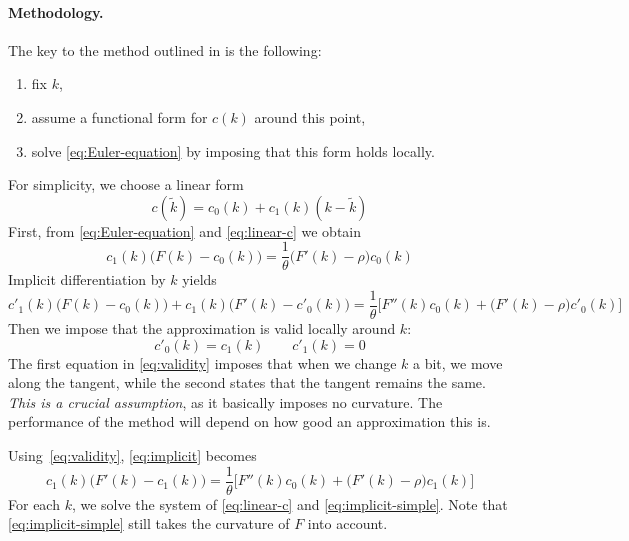 \documentclass[a4paper,11pt]{article}
\newcommand{\tk}{\tilde{k}}
\begin{document}
\paragraph{Methodology.} The key to the method outlined in \textcite{den2015exact} is the following:
\begin{enumerate}
\item fix $k$,
\item assume a functional form for $c(k)$ around this point,
\item solve \eqref{eq:Euler-equation} by imposing that this form holds locally.
\end{enumerate}
For simplicity, we choose a linear form
\begin{equation}
  \label{eq:linear-c}
  c(\tk) = c_0(k) + c_1(k)(k-\tk)
\end{equation}
First, from \eqref{eq:Euler-equation} and \eqref{eq:linear-c} we obtain
\begin{equation}
  \label{eq:linear-Euler}
  c_1(k)\bigl( F(k) - c_0(k) \bigr) = \frac{1}{\theta}\bigl( F'(k) - \rho \bigr) c_0(k) 
\end{equation}
Implicit differentiation by $k$ yields
\begin{equation}
  \label{eq:implicit}
  c'_1(k)\bigl( F(k) - c_0(k) \bigr) + c_1(k)\bigl( F'(k) - c'_0(k) \bigr) =
  \frac{1}{\theta}\biggl[ F''(k) c_0(k) + \bigl( F'(k) - \rho \bigr) c'_0(k) \biggr]
\end{equation}
Then we impose that the approximation is valid locally around $k$:
\begin{equation}
  \label{eq:validity}
  c'_0(k) = c_1(k)
  \qquad
  c'_1(k) = 0
\end{equation}
The first equation in \eqref{eq:validity} imposes that when we change $k$ a bit, we move along the tangent, while the second states that the tangent remains the same. \emph{This is a crucial assumption}, as it basically imposes no curvature. The performance of the method will depend on how good an approximation this is.

Using~\eqref{eq:validity}, \eqref{eq:implicit} becomes
\begin{equation}
  \label{eq:implicit-simple}
  c_1(k)\bigl( F'(k) - c_1(k) \bigr) = \frac{1}{\theta}\biggl[ F''(k) c_0(k) + \bigl( F'(k) - \rho \bigr) c_1(k) \biggr]
\end{equation}
For each $k$, we solve the system of \eqref{eq:linear-c} and \eqref{eq:implicit-simple}. 
Note that \eqref{eq:implicit-simple} still takes the curvature of $F$ into account.
\end{document}
